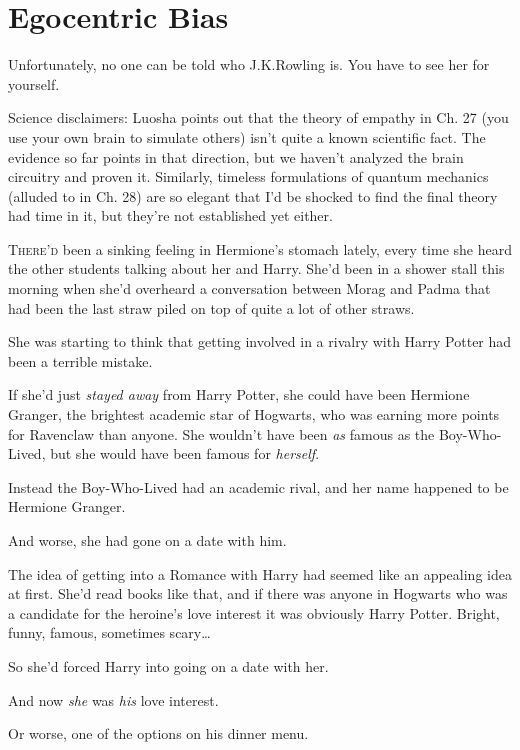\chapter{Egocentric Bias}

\begin{chapterOpeningAuthorNote}
Unfortunately, no one can be told who J.\?K.\?Rowling is. You have to see her for yourself.

Science disclaimers: Luosha points out that the theory of empathy in Ch. 27 (you use your own brain to simulate others) isn't quite a known scientific fact. The evidence so far points in that direction, but we haven't analyzed the brain circuitry and proven it. Similarly, timeless formulations of quantum mechanics (alluded to in Ch. 28) are so elegant that I'd be shocked to find the final theory had time in it, but they're not established yet either.
\end{chapterOpeningAuthorNote}

\lettrine{T}{here'd} been a sinking feeling in Hermione's stomach lately, every time she heard the other students talking about her and Harry. She'd been in a shower stall this morning when she'd overheard a conversation between Morag and Padma that had been the last straw piled on top of quite a lot of other straws.

She was starting to think that getting involved in a rivalry with Harry Potter had been a terrible mistake.

If she'd just \emph{stayed away} from Harry Potter, she could have been Hermione Granger, the brightest academic star of Hogwarts, who was earning more points for Ravenclaw than anyone. She wouldn't have been \emph{as} famous as the Boy-Who-Lived, but she would have been famous for \emph{herself}.

Instead the Boy-Who-Lived had an academic rival, and her name happened to be Hermione Granger.

And worse, she had gone on a date with him.

The idea of getting into a Romance with Harry had seemed like an appealing idea at first. She'd read books like that, and if there was anyone in Hogwarts who was a candidate for the heroine's love interest it was obviously Harry Potter. Bright, funny, famous, sometimes scary{\ldots}

So she'd forced Harry into going on a date with her.

And now \emph{she} was \emph{his} love interest.

Or worse, one of the options on his dinner menu.

